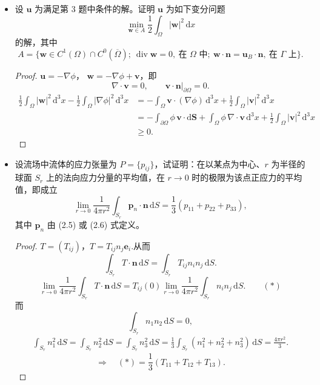 \begin{itemize}
    \item[4.]设 $\boldsymbol{u}$ 为满足第 3 题中条件的解。证明 $\boldsymbol{u}$ 为如下变分问题
    $$
    \min_{\boldsymbol{w}\in A}
    \frac{1}{2}\int_\Omega|\boldsymbol{w}|^2\,\mathrm dx
    $$
    的解，其中
    $$
    A=\{\boldsymbol{w}\in C^1(\Omega)\cap C^0(\overline{\Omega});
    \ \operatorname{div}\boldsymbol{w}=0,\ \text{在 }\Omega\text{ 中};
    \ \boldsymbol{w}\cdot\boldsymbol{n}
    =\boldsymbol{u}_B\cdot\boldsymbol{n},\ \text{在 }\Gamma\text{ 上}\}.
    $$

    \begin{proof}
    $\boldsymbol{u}=-\nabla\phi$，
    $\boldsymbol{w}=-\nabla\phi+\boldsymbol{v}$，即
    $$
    \nabla\cdot\boldsymbol{v}=0,\qquad
    \left.\boldsymbol{v}\cdot\boldsymbol{n}\right|_{\partial\Omega}=0.
    $$
    $$
    \begin{aligned}
    \frac{1}{2}\int_\Omega|\boldsymbol{w}|^2\,\mathrm d^3x
    -\frac{1}{2}\int_\Omega|\nabla\phi|^2\,\mathrm d^3x
    &=-\int_\Omega\boldsymbol{v}\cdot(\nabla\phi)\,\mathrm d^3x
    +\frac{1}{2}\int_\Omega|\boldsymbol{v}|^2\,\mathrm d^3x\\
    &=-\int_{\partial\Omega}\phi\,\boldsymbol{v}
    \cdot\mathrm d\boldsymbol{S}
    +\int_\Omega\phi\,\nabla\cdot\boldsymbol{v}\,\mathrm d^3x
    +\frac{1}{2}\int_\Omega|\boldsymbol{v}|^2\,\mathrm d^3x\\
    &\geq 0.
    \end{aligned}
    $$
    \end{proof}

    \item[5.]设流场中流体的应力张量为 $P=\{p_{ij}\}$，试证明：在以某点为中心、$r$ 为半径的球面 $S_r$ 上的法向应力分量的平均值，在 $r\to0$ 时的极限为该点正应力的平均值，即成立
    $$
    \lim_{r\to0}\frac{1}{4\pi r^2}
    \int_{S_r}\boldsymbol{p}_n\cdot\boldsymbol{n}\,\mathrm dS
    =\frac{1}{3}(p_{11}+p_{22}+p_{33}),
    $$
    其中 $\boldsymbol{p}_n$ 由 (2.5) 或 (2.6) 式定义。

    \begin{proof}
    $T=(T_{ij})，
    T=T_{ij}n_j\boldsymbol{e}_i.
    $从而
    $$
    \int_{S_r}T\cdot\boldsymbol{n}\,\mathrm dS
    =\int_{S_r}T_{ij}n_in_j\,\mathrm dS.
    $$
    $$
    \lim_{r\to0}\frac{1}{4\pi r^2}
    \int_{S_r}T\cdot\boldsymbol{n}\,\mathrm dS
    =T_{ij}(0)\lim_{r\to0}\frac{1}{4\pi r^2}
    \int_{S_r}n_in_j\,\mathrm dS.\qquad(*)
    $$
    而
    $$
    \int_{S_r}n_1n_2\,\mathrm dS=0,
    $$
    $$
    \begin{aligned}
    \int_{S_r}n_1^2\,\mathrm dS
    =\int_{S_r}n_2^2\,\mathrm dS
    =\int_{S_r}n_3^2\,\mathrm dS
    =\frac{1}{3}\int_{S_r}(n_1^2+n_2^2+n_3^2)\,\mathrm dS
    =\frac{4\pi r^2}{3}.
    \end{aligned}
    $$
    $$
    \Longrightarrow\quad
    (*)=\frac{1}{3}(T_{11}+T_{12}+T_{13}).
    $$
    \end{proof}


\end{itemize}
